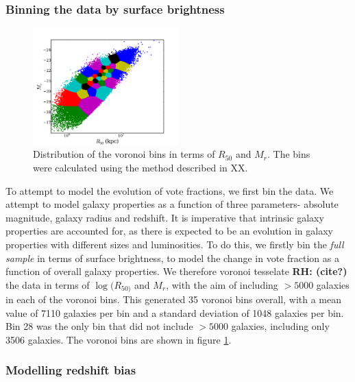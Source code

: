 \documentclass[useAMS,usenatbib]{mn2e}
\newcommand{\rh}[1]{{\bf \textcolor{RoyalPurple}{RH: #1}}}
\begin{document}
\subsubsection{Binning the data by surface brightness}

\begin{figure}
		\centering
		
        \includegraphics[width=0.5\textwidth]{Bias_imgs/voronoi_bins.pdf}
		
        \caption{Distribution of the voronoi bins in terms of $R_{50}$ and $M_r$. The bins were calculated using the method described in XX.} 
		
        \label{fig:voronoi_bins}
        
\end{figure}

To attempt to model the evolution of vote fractions, we first bin the data. We attempt to model galaxy properties as a function of three parameters- absolute magnitude, galaxy radius and redshift. It is imperative that intrinsic galaxy properties are accounted for, as there is expected to be an evolution in galaxy properties with different sizes and luminosities. To do this, we firstly bin the \textit{full sample} in terms of surface brightness, to model the change in vote fraction as a function of overall galaxy properties. We therefore voronoi tesselate \rh{(cite?)} the data in terms of $\log(R_{50)}$ and $M_r$, with the aim of including $>5000$ galaxies in each of the voronoi bins. This generated 35 voronoi bins overall, with a mean value of 7110 galaxies per bin and a standard deviation of 1048 galaxies per bin. Bin 28 was the only bin that did not include $>5000$ galaxies, including only 3506 galaxies. The voronoi bins are shown in figure \ref{fig:voronoi_bins}. 

\subsubsection{Modelling redshift bias}
\end{document}

